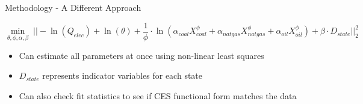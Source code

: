 \documentclass[11pt,aspectratio=169]{beamer}
\begin{document}
\begin{frame}{Methodology - A Different Approach}


\vspace{0.5em}

\begin{block}{}
	$$\min_{\theta, \phi, \alpha, \beta} \; || - \ln \left( Q_{elec} \right) + \ln(\theta) + \frac{1}{\phi} \cdot \ln \left( \alpha_{coal} X_{coal}^\phi + \alpha_{natgas} X_{natgas}^\phi + \alpha_{oil} X_{oil}^\phi\right) + \beta \cdot D_{state} ||_2^2$$
\end{block}

\vspace{-1em}
 
\begin{itemize}
	
	\setlength\itemsep{1em}
	
	\item Can estimate all parameters at once using non-linear least squares 
	
	\item $D_{state}$ represents indicator variables for each state
	
	\item Can also check fit statistics to see if CES functional form matches the data
	
\end{itemize}

\end{frame}
\end{document}
